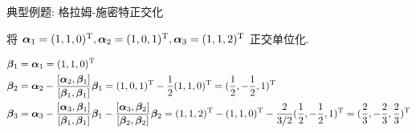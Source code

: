 \begin{frame}{典型例题: 格拉姆-施密特正交化}\small
	\onslide<+->
	\begin{example}
		将 $\bma_1=(1,1,0)^\rmT,\bma_2=(1,0,1)^\rmT,\bma_3=(1,1,2)^\rmT$ 正交单位化.
	\end{example}
	\onslide<+->
	\begin{solution}
		\begin{align*}
			\bmb_1&=\bma_1=(1,1,0)^\rmT\\
			\bmb_2&=\bma_2-\frac{[\bma_2,\bmb_1]}{[\bmb_1,\bmb_1]}\bmb_1=(1,0,1)^\rmT-\frac12(1,1,0)^\rmT=(\frac12,-\frac12,1)^\rmT\\
			\bmb_3&=\bma_3-\frac{[\bma_3,\bmb_1]}{[\bmb_1,\bmb_1]}\bmb_1-\frac{[\bma_3,\bmb_2]}{[\bmb_2,\bmb_2]}\bmb_2
			=(1,1,2)^\rmT-(1,1,0)^\rmT-\frac2{3/2}(\frac12,-\frac12,1)^\rmT=(\frac23,-\frac23,\frac23)^\rmT
		\end{align*}
		\onslide<+->{%
			\[
			\bfe_1=\dfrac{\bfb_1}{\|\bfb_1\|}
				=\frac1{\sqrt2}(1,1,0)^\rmT,\quad
			\bfe_2=\dfrac{\bfb_2}{\|\bfb_2\|}
				=\frac1{\sqrt6}(1,-1,2)^\rmT,\quad
			\bfe_3=\dfrac{\bfb_3}{\|\bfb_3\|}
				=\frac1{\sqrt3}(-1,1,1)^\rmT.
		\]}
	\end{solution}
\end{frame}

